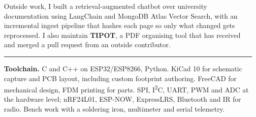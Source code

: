 \documentclass[11pt,a4paper]{article}
\begin{document}
Outside work, I built a retrieval-augmented chatbot over university
documentation using LangChain and MongoDB Atlas Vector Search, with an
incremental ingest pipeline that hashes each page so only what changed gets
reprocessed. I also maintain \textbf{TIPOT}, a PDF organising tool that has
received and merged a pull request from an outside contributor.

\vspace{8pt}
\hrule
\vspace{6pt}

\textbf{Toolchain.} C and C++ on ESP32/ESP8266, Python. KiCad 10 for schematic
capture and PCB layout, including custom footprint authoring. FreeCAD for
mechanical design, FDM printing for parts. SPI, I\textsuperscript{2}C, UART, PWM
and ADC at the hardware level; nRF24L01, ESP-NOW, ExpressLRS, Bluetooth and IR
for radio. Bench work with a soldering iron, multimeter and serial telemetry.
\end{document}
